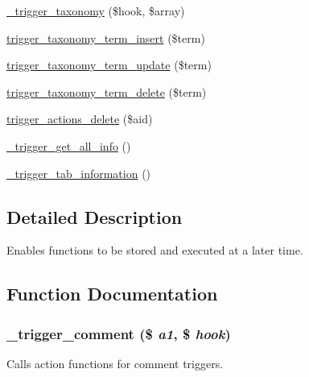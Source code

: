 \begin{DoxyCompactItemize}
\item 
\hyperlink{trigger_8module_a359aa09b818c6ca9e9b14f57525955c1}{\_\-trigger\_\-taxonomy} (\$hook, \$array)
\item 
\hyperlink{trigger_8module_a2b0fedc61884a4456e603f46016d272b}{trigger\_\-taxonomy\_\-term\_\-insert} (\$term)
\item 
\hyperlink{trigger_8module_a63ef6631e2d47302d35b0d14d880b983}{trigger\_\-taxonomy\_\-term\_\-update} (\$term)
\item 
\hyperlink{trigger_8module_aadcf40cfd8517d3cc419355d46177a1d}{trigger\_\-taxonomy\_\-term\_\-delete} (\$term)
\item 
\hyperlink{trigger_8module_a904aef66799dde9fa679d9564ef905a9}{trigger\_\-actions\_\-delete} (\$aid)
\item 
\hyperlink{trigger_8module_a89a56aa9ad5daffc9f638b4be46b7c08}{\_\-trigger\_\-get\_\-all\_\-info} ()
\item 
\hyperlink{trigger_8module_ad4f48e6fb2a3a4bb7267edfe8b4dbf83}{\_\-trigger\_\-tab\_\-information} ()
\end{DoxyCompactItemize}


\subsection{Detailed Description}
Enables functions to be stored and executed at a later time. 

\subsection{Function Documentation}
\hypertarget{trigger_8module_a85c6ae6ff856807651018048c8103ed7}{
\subsubsection[{\_\-trigger\_\-comment}]{\setlength{\rightskip}{0pt plus 5cm}\_\-trigger\_\-comment (\$ {\em a1}, \/  \$ {\em hook})}}
\label{trigger_8module_a85c6ae6ff856807651018048c8103ed7}
Calls action functions for comment triggers.



